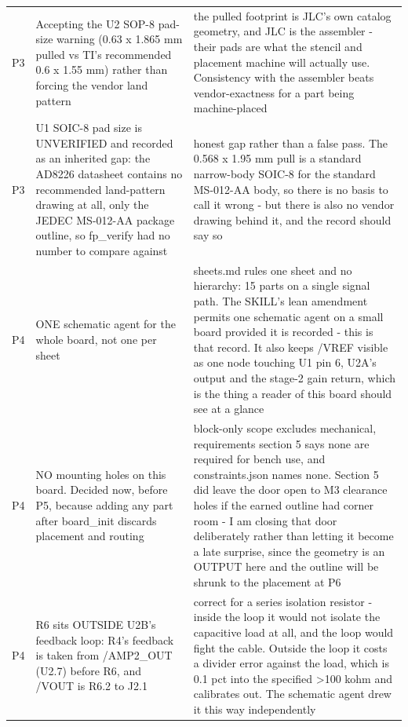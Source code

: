 \documentclass[11pt,a4paper]{article}
\begin{document}
{\begin{longtable}{lp{5.2cm}p{7.2cm}}
P3 & Accepting the U2 SOP-8 pad-size warning (0.63 x 1.865 mm pulled vs TI's recommended 0.6 x 1.55 mm) rather than forcing the vendor land pattern & the pulled footprint is JLC's own catalog geometry, and JLC is the assembler - their pads are what the stencil and placement machine will actually use. Consistency with the assembler beats vendor-exactness for a part being machine-placed \\
P3 & U1 SOIC-8 pad size is UNVERIFIED and recorded as an inherited gap: the AD8226 datasheet contains no recommended land-pattern drawing at all, only the JEDEC MS-012-AA package outline, so fp\_verify had no number to compare against & honest gap rather than a false pass. The 0.568 x 1.95 mm pull is a standard narrow-body SOIC-8 for the standard MS-012-AA body, so there is no basis to call it wrong - but there is also no vendor drawing behind it, and the record should say so \\
P4 & ONE schematic agent for the whole board, not one per sheet & sheets.md rules one sheet and no hierarchy: 15 parts on a single signal path. The SKILL's lean amendment permits one schematic agent on a small board provided it is recorded - this is that record. It also keeps /VREF visible as one node touching U1 pin 6, U2A's output and the stage-2 gain return, which is the thing a reader of this board should see at a glance \\
P4 & NO mounting holes on this board. Decided now, before P5, because adding any part after board\_init discards placement and routing & block-only scope excludes mechanical, requirements section 5 says none are required for bench use, and constraints.json names none. Section 5 did leave the door open to M3 clearance holes if the earned outline had corner room - I am closing that door deliberately rather than letting it become a late surprise, since the geometry is an OUTPUT here and the outline will be shrunk to the placement at P6 \\
P4 & R6 sits OUTSIDE U2B's feedback loop: R4's feedback is taken from /AMP2\_OUT (U2.7) before R6, and /VOUT is R6.2 to J2.1 & correct for a series isolation resistor - inside the loop it would not isolate the capacitive load at all, and the loop would fight the cable. Outside the loop it costs a divider error against the load, which is 0.1 pct into the specified \textgreater{}100 kohm and calibrates out. The schematic agent drew it this way independently \\

\end{longtable}}
\end{document}
